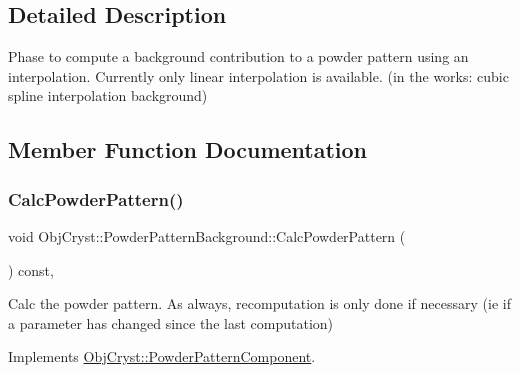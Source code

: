 \subsection{Detailed Description}
Phase to compute a background contribution to a powder pattern using an interpolation. Currently only linear interpolation is available. (in the works\+: cubic spline interpolation background) 

\subsection{Member Function Documentation}
\mbox{\label{class_obj_cryst_1_1_powder_pattern_background_a6e564159536442870bfb17be8e5b51e8}} 
\subsubsection{\texorpdfstring{CalcPowderPattern()}{CalcPowderPattern()}}
{\footnotesize\ttfamily void Obj\+Cryst\+::\+Powder\+Pattern\+Background\+::\+Calc\+Powder\+Pattern (\begin{DoxyParamCaption}{ }\end{DoxyParamCaption}) const\hspace{0.3cm}{\ttfamily [protected]}, {\ttfamily [virtual]}}

Calc the powder pattern. As always, recomputation is only done if necessary (ie if a parameter has changed since the last computation) 

Implements \mbox{\hyperlink{class_obj_cryst_1_1_powder_pattern_component_a8417ecb93009a9b7b9fccf074a9438d9}{Obj\+Cryst\+::\+Powder\+Pattern\+Component}}.

